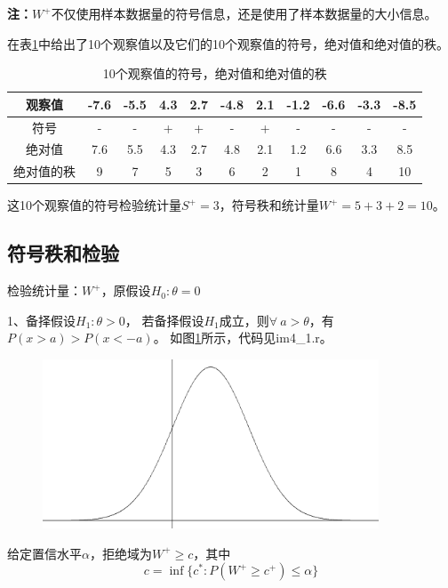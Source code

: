 \documentclass[lang=cn,10pt]{elegantbook}
\begin{document}
\textbf{注：}$W^+$不仅使用样本数据量的符号信息，还是使用了样本数据量的大小信息。

在表\ref{ta4.1}中给出了10个观察值以及它们的10个观察值的符号，绝对值和绝对值的秩。
\begin{table}[htbp]
    \centering
    \caption{10个观察值的符号，绝对值和绝对值的秩}
    \label{ta4.1}
    \begin{tabular}{c|c|c|c|c|c|c|c|c|c|c}
        \hline
        观察值     & -7.6 & -5.5 & 4.3 & 2.7 & -4.8 & 2.1 & -1.2 & -6.6 & -3.3 & -8.5 \\
        \hline
        符号       & -    & -    & +   & +   & -    & +   & -    & -    & -    & -    \\
        \hline
        绝对值     & 7.6  & 5.5  & 4.3 & 2.7 & 4.8  & 2.1 & 1.2  & 6.6  & 3.3  & 8.5  \\
        \hline
        绝对值的秩 & 9    & 7    & 5   & 3   & 6    & 2   & 1    & 8    & 4    & 10   \\
        \hline
    \end{tabular}
\end{table}
这10个观察值的符号检验统计量$S^+=3$，符号秩和统计量$W^+=5+3+2=10$。

\subsection{符号秩和检验}
检验统计量：$W^+$，原假设$H_0:\theta = 0$

1、备择假设$H_1:\theta>0$，
若备择假设$H_1$成立，则$\forall ~a>\theta $，有$P(x>a)>P(x<-a)$。
如图\ref{im4_1}所示，代码见im4\_1.r。

\begin{figure}[hp]
    \centering
    \includegraphics[width = 10cm]{img/im4_1.png}
    \caption{}
    \label{im4_1}
\end{figure}

给定置信水平$\alpha$，拒绝域为$W^+\geq c$，其中
\begin{equation*}
    c=\inf\{c^*:P(W^+\geqslant c^+)\leqslant\alpha\}
\end{equation*}
\end{document}
